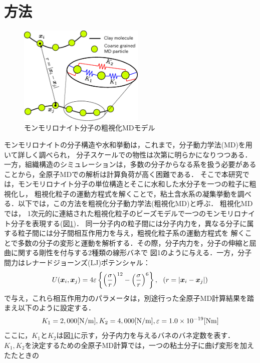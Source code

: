 ﻿\documentclass[11pt,a4j]{jarticle}
\begin{document}
\section{方法}
\begin{figure}
	\centering
	\includegraphics[keepaspectratio,width=60mm]{Figs/cg_model.eps}
	\caption{モンモリロナイト分子の粗視化MDモデル}
	\label{fig:fig1}
\end{figure}
モンモリロナイトの分子構造や水和挙動は，これまで，分子動力学法(MD)を用いて詳しく調べられ，
分子スケールでの物性は次第に明らかになりつつある\cite{Kawamura}．
一方，組織構造のシミュレーションは，多数の分子からなる系を扱う必要があることから，全原子MDでの解析は計算負荷が高く困難である．
そこで本研究では，モンモリロナイト分子の単位構造とそこに水和した水分子を一つの粒子に粗視化し，
粗視化粒子の運動方程式を解くことで，粘土含水系の凝集挙動を調べる．以下では，この方法を粗視化分子動力学法(粗視化MD)と呼ぶ．
粗視化MDでは， 1次元的に連結された粗視化粒子のビーズモデルで一つのモンモリロナイト分子を表現する(図\ref{fig:fig1})．
同一分子内の粒子間には分子内力を，異なる分子に属する粒子間には分子間相互作用力を与え，粗視化粒子系の運動方程式を
解くことで多数の分子の変形と運動を解析する．その際，分子内力を，分子の伸縮と屈曲に関する剛性を付与する2種類の線形バネで
図1のように与える．一方，分子間力はレナードジョーンズ(LJ)ポテンシャル：
\begin{equation}
	U(\mbox{\boldmath $x$}_i,\mbox{\boldmath $x$}_j)=4\varepsilon
	\left\{ \left(\frac{\sigma}{r}\right)^{12}-
	\left( \frac{\sigma}{r}\right)^6\right\}, 
	\ \ \left(r=\left| \mbox{\boldmath $x$}_i-\mbox{\boldmath $x$}_j\right|\right)
	\label{eqn:LJ}
\end{equation}
で与え，これら相互作用力のパラメータは，別途行った全原子MD計算結果を踏まえ以下のように設定する．
\begin{equation}
	K_1  = 2,000[{\rm N / m}],   K_2  = 4,000[{\rm N / m}],  \varepsilon = 1.0\times10^{-19}     [{\rm Nm}]
	\label{eqn:prms}
\end{equation}
ここに，$K_1$と$K_2$は図\ref{fig:fig1}に示す，分子内力を与えるバネのバネ定数を表す．
$K_1,K_2$を決定するための全原子MD計算では，一つの粘土分子に曲げ変形を加えたたときの
\end{document}
